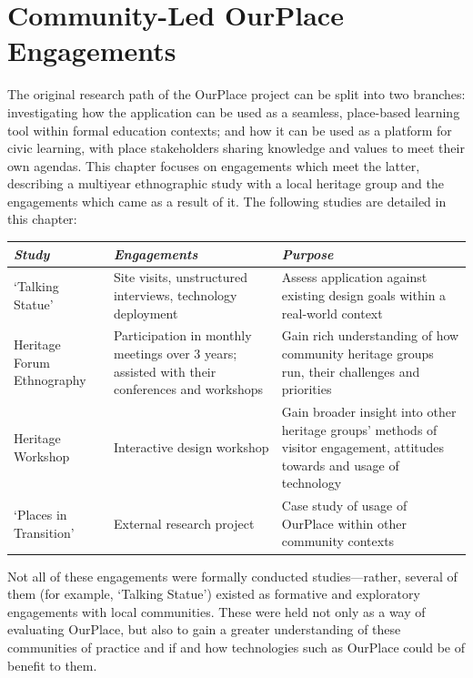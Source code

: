 \chapter{Community-Led OurPlace Engagements}
\label{chap:Community}

The original research path of the OurPlace project can be split into two branches: investigating how the application can be used as a seamless, place-based learning tool within formal education contexts; and how it can be used as a platform for civic learning, with place stakeholders sharing knowledge and values to meet their own agendas. This chapter focuses on engagements which meet the latter, describing a multiyear ethnographic study with a local heritage group and the engagements which came as a result of it. The following studies are detailed in this chapter:

{\raggedright
\begin{tabularx}{\textwidth}{| p{35mm} | p{50mm} | X |}
\hline
    {\small\textit{\textbf{Study}}}
    & {\small\textit{\textbf{Engagements}}} 
    & {\small\textit{\textbf{Purpose}}} \\
    \hline
    {\footnotesize `Talking Statue' }
    & {\footnotesize Site visits, unstructured interviews, technology deployment} 
    & {\footnotesize Assess application against existing design goals within a real-world context} \\
    \hline
    {\footnotesize Heritage Forum Ethnography }
    & {\footnotesize Participation in monthly meetings over 3 years; assisted with their conferences and workshops} 
    & {\footnotesize Gain rich understanding of how community heritage groups run, their challenges and priorities}  \\
    \hline
    {\footnotesize Heritage Workshop }
    & {\footnotesize Interactive design workshop} 
    & {\footnotesize Gain broader insight into other heritage groups' methods of visitor engagement, attitudes towards and usage of technology}  \\
    \hline
    {\footnotesize `Places in Transition' }
    & {\footnotesize External research project} 
    & {\footnotesize Case study of usage of OurPlace within other community contexts }  \\
    \hline
\end{tabularx}
}

\setlength{\parskip}{1em}

Not all of these engagements were formally conducted studies---rather, several of them (for example, `Talking Statue') existed as formative and exploratory engagements with local communities. These were held not only as a way of evaluating OurPlace, but also to gain a greater understanding of these communities of practice and if and how technologies such as OurPlace could be of benefit to them.

